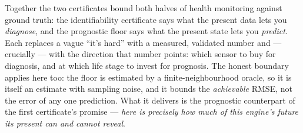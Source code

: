 Together the two certificates bound both halves of health monitoring against ground truth:
the identifiability certificate says what the present data lets you \emph{diagnose}, and the
prognostic floor says what the present state lets you \emph{predict}. Each replaces a vague
``it's hard'' with a measured, validated number and --- crucially --- with the direction that
number points: which sensor to buy for diagnosis, and at which life stage to invest for
prognosis. The honest boundary applies here too: the floor is estimated by a
finite-neighbourhood oracle, so it is itself an estimate with sampling noise, and it bounds
the \emph{achievable} RMSE, not the error of any one prediction. What it delivers is the
prognostic counterpart of the first certificate's promise --- \emph{here is precisely how much
of this engine's future its present can and cannot reveal}.
